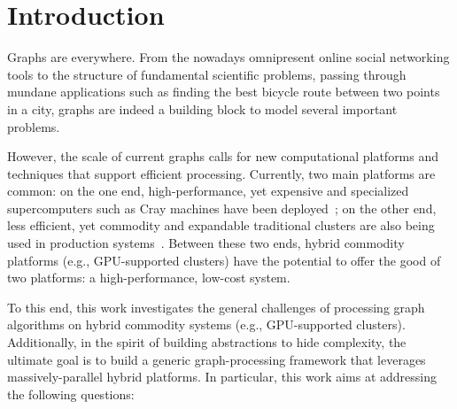 \section{Introduction}
\label{sec:intro}
Graphs are everywhere. From the nowadays omnipresent online social networking tools to the structure of fundamental scientific problems, passing through mundane applications such as finding the best bicycle route between two points in a city, graphs are indeed a building block to model several important problems.

However, the scale of current graphs calls for new computational platforms and techniques that support efficient processing. Currently, two main platforms are common: on the one end, high-performance, yet expensive and specialized supercomputers such as Cray machines have been deployed~\cite{mizell2009early, yoo2005scalable}; on the other end, less efficient, yet commodity and expandable traditional clusters are also being used in production systems~\cite{Malewicz2009}. Between these two ends, hybrid commodity platforms (e.g., GPU-supported clusters) have the potential to offer the good of two platforms: a high-performance, low-cost system.

To this end, this work investigates the general challenges of processing graph algorithms on hybrid commodity systems (e.g., GPU-supported clusters). Additionally, in the spirit of building abstractions to hide complexity, the ultimate goal is to build a generic graph-processing framework that leverages massively-parallel hybrid platforms. In particular, this work aims at addressing the following questions:

